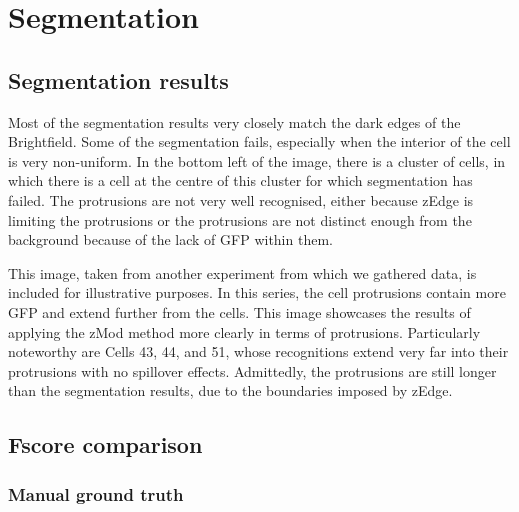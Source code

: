 \section{Segmentation}

\subsection{Segmentation results}


Most of the segmentation results very closely match the dark edges of the Brightfield. Some of the segmentation fails, especially when the interior of the cell is very non-uniform. In the bottom left of the image, there is a cluster of cells, in which there is a cell at the centre of this cluster for which segmentation has failed. The protrusions are not very well recognised, either because zEdge is limiting the protrusions or the protrusions are not distinct enough from the background because of the lack of GFP within them.


This image, taken from another experiment from which we gathered data, is included for illustrative purposes. In this series, the cell protrusions contain more GFP and extend further from the cells. This image showcases the results of applying the zMod method more clearly in terms of protrusions. Particularly noteworthy are Cells 43, 44, and 51, whose recognitions extend very far into their protrusions with no spillover effects. Admittedly, the protrusions are still longer than the segmentation results, due to the boundaries imposed by zEdge.

\subsection{Fscore comparison}

\subsubsection{Manual ground truth}

